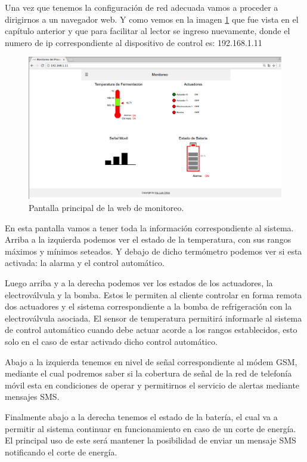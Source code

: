 Una vez que tenemos la configuración de red adecuada vamos a proceder a dirigirnos a un navegador web. Y como vemos en la imagen \ref{fig:web_monitoreo} que fue vista en el capítulo anterior y que para facilitar al lector se ingreso nuevamente, donde el numero de ip correspondiente al dispositivo de control es: 192.168.1.11 

\begin{figure}[h]
  \centering
  \includegraphics[scale=.25]{./Figures/web_monitoreo.png}
  \caption{Pantalla principal de la web de monitoreo.}
  \label{fig:web_monitoreo}
\end{figure}

En esta pantalla vamos a tener toda la información correspondiente al sistema. Arriba a la izquierda podemos ver el estado de la temperatura, con sus rangos máximos y mínimos seteados. Y debajo de dicho termómetro podemos ver si esta activada: la alarma y el control automático.

Luego arriba y a la derecha podemos ver los estados de los actuadores, la electroválvula y la bomba. Estos le permiten al cliente controlar en forma remota dos actuadores y el sistema correspondiente a la bomba de refrigeración con la electroválvula asociada. El sensor de temperatura permitirá informarle al sistema de control automático cuando debe actuar acorde a los rangos establecidos, esto solo en el caso de estar activado dicho control automático. 

Abajo a la izquierda tenemos en nivel de señal correspondiente al módem GSM, mediante el cual podremos saber si la cobertura de señal de la red de telefonía móvil esta en condiciones de operar y permitirnos el servicio de alertas mediante mensajes SMS. 

Finalmente abajo a la derecha tenemos el estado de la batería, el cual va a permitir al sistema continuar en funcionamiento en caso de un corte de energía. El principal uso de este será mantener la posibilidad de enviar un mensaje SMS notificando el corte de energía.

